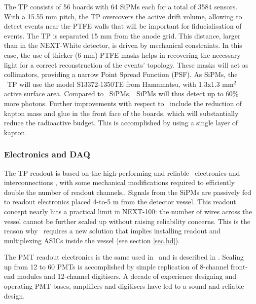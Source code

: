 The TP consists of 56 boards with 64 SiPMs each for a total of 3584 sensors. With a 15.55 mm pitch, the TP overcovers the active drift volume, allowing to detect events near the PTFE walls that will be important for fiducialisation of events.
The TP is separated 15 mm from the anode grid. This distance, larger than in the NEXT-White detector, is driven by mechanical constraints. In this case, the use of thicker (6 mm) PTFE masks helps in recovering the necessary light for a correct reconstruction of the events’ topology. These masks will act as collimators, providing a narrow Point Spread Function (PSF). As SiPMs, the \Next\ TP will use the model S13372-1350TE from Hamamatsu, with 1.3x1.3 mm$^2$ active surface area. Compared to \New\ SiPMs, \Next\ SiPMs will thus detect up to 60\% more photons.
Further improvements with respect to \NEW\ include the reduction of kapton mass and glue in the front face of the boards, which will substantially reduce the radioactive budget. This is accomplished by using a single layer of kapton.

\subsubsection{Electronics and DAQ}

The TP readout is based on the high-performing and reliable \NEW\ electronics and interconnections \cite{Rodriguez:2015a}, with some mechanical modifications required to efficiently double the number of readout channels,. Signals from the SiPMs are passively fed to readout electronics placed 4-to-5 m from the detector vessel. This readout concept nearly hits a practical limit in NEXT-100: the number of wires across the vessel cannot be further scaled up without raising reliability concerns. This is the reason why \NHD\  requires a new solution that implies installing readout and multiplexing ASICs inside the vessel (see section \ref{sec.hd}). %


The PMT readout electronics is the same  used in \NEW\ and is described in \cite{Alvarez:2019a}. Scaling up from 12 to 60 PMTs is accomplished by simple replication of 8-channel front-end modules and 12-channel digitisers. A decade of experience designing and operating PMT bases, amplifiers and digitisers have led to a sound and reliable design. %

